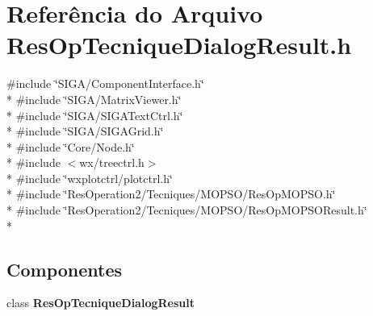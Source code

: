 \section{Referência do Arquivo Res\+Op\+Tecnique\+Dialog\+Result.\+h}
\label{_2_tecniques_2_res_op_tecnique_dialog_result_8h}
{\ttfamily \#include \char`\"{}S\+I\+G\+A/\+Component\+Interface.\+h\char`\"{}}\\*
{\ttfamily \#include \char`\"{}S\+I\+G\+A/\+Matrix\+Viewer.\+h\char`\"{}}\\*
{\ttfamily \#include \char`\"{}S\+I\+G\+A/\+S\+I\+G\+A\+Text\+Ctrl.\+h\char`\"{}}\\*
{\ttfamily \#include \char`\"{}S\+I\+G\+A/\+S\+I\+G\+A\+Grid.\+h\char`\"{}}\\*
{\ttfamily \#include \char`\"{}Core/\+Node.\+h\char`\"{}}\\*
{\ttfamily \#include $<$wx/treectrl.\+h$>$}\\*
{\ttfamily \#include \char`\"{}wxplotctrl/plotctrl.\+h\char`\"{}}\\*
{\ttfamily \#include \char`\"{}Res\+Operation2/\+Tecniques/\+M\+O\+P\+S\+O/\+Res\+Op\+M\+O\+P\+S\+O.\+h\char`\"{}}\\*
{\ttfamily \#include \char`\"{}Res\+Operation2/\+Tecniques/\+M\+O\+P\+S\+O/\+Res\+Op\+M\+O\+P\+S\+O\+Result.\+h\char`\"{}}\\*
\subsection*{Componentes}
\begin{DoxyCompactItemize}
\item 
class {\bf Res\+Op\+Tecnique\+Dialog\+Result}
\end{DoxyCompactItemize}
